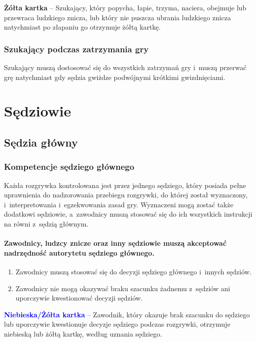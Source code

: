 \documentclass[12pt]{article}
\newcommand\yellowcard[1]{\bgroup\textcolor{darkyellow}{\textbf{#1}}}
\newcommand\bluecard[1]{\bgroup\textcolor{blue}{\textbf{#1}}}
\begin{document}
\yellowcard{Żółta kartka} -- Szukający, który popycha, łapie, trzyma, naciera,
obejmuje lub przewraca ludzkiego znicza, lub który nie puszcza ubrania
ludzkiego znicza natychmiast po złapaniu go otrzymuje żółtą kartkę.

\subsubsection{Szukający podczas zatrzymania gry}

Szukający muszą dostosować się do wszystkich zatrzymań gry i~muszą
przerwać grę natychmiast gdy sędzia gwiżdze podwójnymi krótkimi
gwizdnięciami.

\pagebreak
\section{Sędziowie}

\subsection{Sędzia główny}

\subsubsection{Kompetencje sędziego głównego}

Każda rozgrywka kontrolowana jest przez jednego sędziego, który posiada
pełne uprawnienia do nadzorowania przebiegu rozgrywki, do której został
wyznaczony, i~interpretowania i~egzekwowania zasad gry. Wyznaczeni mogą
zostać także dodatkowi sędziowie, a~zawodnicy muszą stosować się do ich
wszystkich instrukcji na równi z~sędzią głównym.

\paragraph{Zawodnicy, ludzcy znicze oraz inny sędziowie muszą
	akceptować nadrzędność autorytetu sędziego głównego.}

\begin{enumerate}
	\item
	      Zawodnicy muszą stosować się do decyzji sędziego głównego i~innych
	      sędziów.
	\item
	      Zawodnicy nie mogą okazywać braku szacunku żadnemu z~sędziów ani
	      uporczywie kwestionować decyzji sędziów.
\end{enumerate}

\bluecard{Niebieska/Żółta kartka} -- Zawodnik, który okazuje brak szacunku do
sędziego lub uporczywie kwestionuje decyzje sędziego podczas rozgrywki,
otrzymuje niebieską lub żółtą kartkę, według uznania sędziego.
\end{document}
